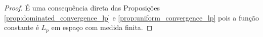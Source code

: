 \begin{proof}
    É uma consequência direta das Proposições \ref{prop:dominated_convergence_lp} e \ref{prop:uniform_convergence_lp} pois a função constante é $L_p$ em espaço com medida finita.
\end{proof}